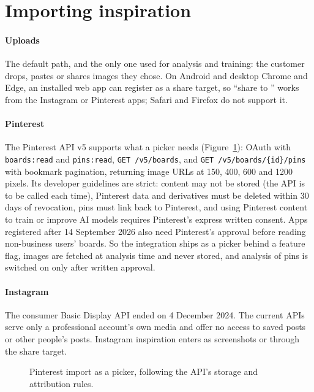 \section{Importing inspiration}

\paragraph{Uploads} The default path, and the only one used for analysis and training: the customer drops, pastes or shares images they chose. On Android and desktop Chrome and Edge, an installed web app can register as a share target, so ``share to \sys{}'' works from the Instagram or Pinterest apps; Safari and Firefox do not support it.

\paragraph{Pinterest} The Pinterest API v5 supports what a picker needs (Figure~\ref{fig:pin}): OAuth with \texttt{boards:read} and \texttt{pins:read}, \texttt{GET /v5/boards}, and \texttt{GET /v5/boards/\{id\}/pins} with bookmark pagination, returning image URLs at 150, 400, 600 and 1200 pixels. Its developer guidelines are strict: content may not be stored (the API is to be called each time), Pinterest data and derivatives must be deleted within 30 days of revocation, pins must link back to Pinterest, and using Pinterest content to train or improve AI models requires Pinterest's express written consent. Apps registered after 14 September 2026 also need Pinterest's approval before reading non-business users' boards. So the integration ships as a picker behind a feature flag, images are fetched at analysis time and never stored, and analysis of pins is switched on only after written approval.

\paragraph{Instagram} The consumer Basic Display API ended on 4 December 2024. The current APIs serve only a professional account's own media and offer no access to saved posts or other people's posts. Instagram inspiration enters as screenshots or through the share target.

\begin{figure}[h]
\centering
\caption{Pinterest import as a picker, following the API's storage and attribution rules.}\label{fig:pin}
\end{figure}

